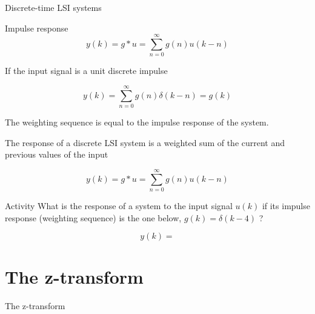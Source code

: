 \documentclass[presentation,aspectratio=169]{beamer}
\begin{document}
\begin{frame}[label={sec:orgd188ba8}]{Discrete-time LSI systems}
\begin{block}{Impulse response}
\[ y(k) = g \ast u = \sum_{n=0}^\infty g(n) u(k-n) \]

If the input signal is a unit discrete impulse

\begin{center}
\end{center}


\pause

\[ y(k) = \sum_{n=0}^\infty g(n) \delta(k-n) = g(k) \]

\alert{The weighting sequence is equal to the impulse response of the system.}
\end{block}
\end{frame}

\begin{frame}[label={sec:org04c3c97}]{The response of a discrete LSI system is a weighted sum of the current and previous values of the input}
\small

\[ y(k) = g \ast u = \sum_{n=0}^\infty g(n) u(k-n) \]


\alert{Activity} What is the response of a system to the input signal \(u(k)\) if its impulse response (weighting sequence) is the one below, \(g(k) = \delta(k-4)\) ?

\begin{center}
\end{center}

\[y(k) = \]
\end{frame}
\section{The z-transform}
\label{sec:org107fcff}
\begin{frame}[label={sec:org0ea6969}]{The z-transform}
\end{frame}
\end{document}
